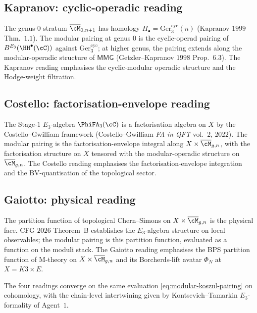 \subsection*{Kapranov: cyclic-operadic reading}

The genus-$0$ stratum $\overline{\cM}_{0, n + 1}$ has homology
$H_\bullet = \mathrm{Ger}_3^{\mathrm{cyc}}(n)$ (Kapranov $1999$
Thm.~$1.1$). The modular pairing at genus $0$ is the cyclic-operad
pairing of $B^{E_3}(\HH^\bullet(\cC))$ against $\mathrm{Ger}_3^{\mathrm{cyc}}$;
at higher genus, the pairing extends along the modular-operadic
structure of $\mathsf{MMG}$ (Getzler--Kapranov $1998$ Prop.~$6.3$).
The Kapranov reading emphasises the cyclic-modular operadic structure
and the Hodge-weight filtration.

\subsection*{Costello: factorisation-envelope reading}

The Stage-$1$ $E_3$-algebra $\PhiFA_3(\cC)$ is a factorisation algebra
on $X$ by the Costello--Gwilliam framework (Costello--Gwilliam \emph{FA
in QFT} vol.~$2$, $2022$). The modular pairing is the factorisation-envelope
integral along $X \times \overline{\cM}_{g, n}$, with the factorisation
structure on $X$ tensored with the modular-operadic structure on
$\overline{\cM}_{g, n}$. The Costello reading emphasises the
factorisation-envelope integration and the BV-quantisation of the
topological sector.

\subsection*{Gaiotto: physical reading}

The partition function of topological Chern--Simons on $X \times
\overline{\cM}_{g, n}$ is the physical face. CFG $2026$ Theorem~B
establishes the $E_3$-algebra structure on local observables; the
modular pairing is this partition function, evaluated as a function on
the moduli stack. The Gaiotto reading emphasises the BPS partition
function of M-theory on $X \times \overline{\cM}_{g, n}$ and its
Borcherds-lift avatar $\Phi_N$ at $X = K3 \times E$.

The four readings converge on the same evaluation \eqref{eq:modular-koszul-pairing}
on cohomology, with the chain-level intertwining given by Kontsevich--Tamarkin
$E_3$-formality of Agent~$1$.


